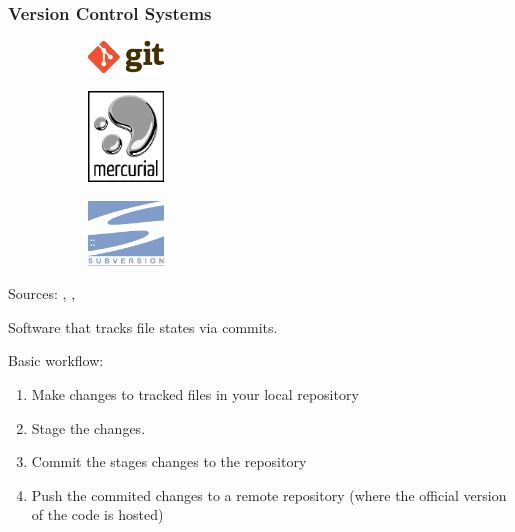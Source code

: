 \begin{frame}
    \frametitle{Version Control Systems}
    \begin{figure}[htpb]
        \begin{subfigure}
        \centering
            \includegraphics[width=2cm]{images/git-logo.eps}
        \end{subfigure}
        \begin{subfigure}
        \centering
            \includegraphics[width=2cm]{images/mercurial-logo.eps}
        \end{subfigure}
        \begin{subfigure}
        \centering
            \includegraphics[width=2cm]{images/subversion-logo.eps}
        \end{subfigure}
    \end{figure}
    \begin{center}
        {\tiny Sources: \cite{git_logo}, \cite{mercurial_logo}, \cite{subversion_logo}}
    \end{center}

    Software that tracks file states via commits.

    Basic workflow:
    \begin{enumerate}
        \item Make changes to tracked files in your local repository
        \item Stage the changes.
        \item Commit the stages changes to the repository
        \item Push the commited changes to a remote repository (where the official version of the code is hosted)
    \end{enumerate}
\end{frame}

